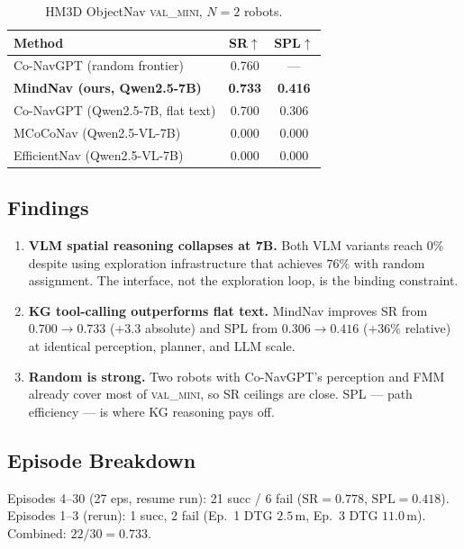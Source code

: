 \begin{table}[h]
\centering\small
\caption{HM3D ObjectNav \textsc{val\_mini}, $N{=}2$ robots.}
\label{tab:main}
\begin{tabular}{lcc}
\toprule
\textbf{Method} & \textbf{SR}$\uparrow$ & \textbf{SPL}$\uparrow$ \\
\midrule
Co-NavGPT (random frontier)            & 0.760 & --- \\
\textbf{MindNav (ours, Qwen2.5-7B)}    & \textbf{0.733} & \textbf{0.416} \\
Co-NavGPT (Qwen2.5-7B, flat text)      & 0.700 & 0.306 \\
MCoCoNav (Qwen2.5-VL-7B)               & 0.000 & 0.000 \\
EfficientNav (Qwen2.5-VL-7B)           & 0.000 & 0.000 \\
\bottomrule
\end{tabular}
\end{table}

\subsection{Findings}
\begin{enumerate}
    \item \textbf{VLM spatial reasoning collapses at 7B.} Both VLM variants
    reach $0\%$ despite using exploration infrastructure that achieves $76\%$
    with random assignment. The interface, not the exploration loop, is the
    binding constraint.
    \item \textbf{KG tool-calling outperforms flat text.} MindNav improves SR
    from $0.700\rightarrow 0.733$ ($+3.3$ absolute) and SPL from
    $0.306\rightarrow 0.416$ ($+36\%$ relative) at identical perception,
    planner, and LLM scale.
    \item \textbf{Random is strong.} Two robots with Co-NavGPT's perception
    and FMM already cover most of \textsc{val\_mini}, so SR ceilings are
    close. SPL --- path efficiency --- is where KG reasoning pays off.
\end{enumerate}

\subsection{Episode Breakdown}
Episodes 4--30 (27 eps, resume run): 21 succ / 6 fail
($\mathrm{SR}{=}0.778$, $\mathrm{SPL}{=}0.418$).
Episodes 1--3 (rerun): 1 succ, 2 fail (Ep.~1 DTG $2.5$\,m, Ep.~3 DTG
$11.0$\,m). Combined: $22/30 = 0.733$.

